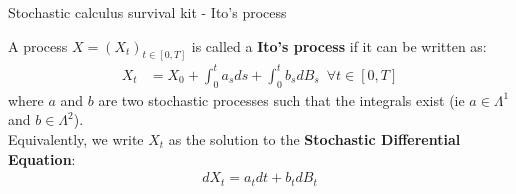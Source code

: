 





\begin{frame}{Stochastic calculus survival kit - Ito's process}
    \begin{definition}
    A process $X = (X_t)_{t \in [0, T]}$ is called a \textbf{Ito's process} if it can be written as:
    \begin{align}
        \label{ito sde definition}
        X_t &= X_0 + \int_{0}^{t}a_s ds + \int_{0}^{t} b_s dB_s \,\,\, \forall t \in [0,T]
    \end{align}
    where $a$ and $b$ are two stochastic processes such that the integrals exist (ie $a \in  \Lambda^1$ and 
    $b \in \Lambda^2$).\\
    Equivalently, we write $X_t$ as the solution to the \textbf{Stochastic Differential Equation}:
    \begin{align*}
        dX_t = a_t dt + b_t dB_t
    \end{align*}
    \end{definition}
\end{frame}

